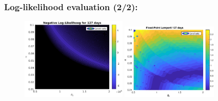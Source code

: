 \documentclass[aspectratio=169]{beamer}\usepackage[utf8]{inputenc}
\begin{document}
\begin{frame}\frametitle{Log-likelihood evaluation (2/2):}

\begin{figure}[ht!]
\centering
\includegraphics[width=0.45\textwidth]{../Results/likelihood/normal/Log-Likelihood_Zoom.eps}
\includegraphics[width=0.41\textwidth]{../Results/likelihood/lamperti/Log-Likelihood_Zoom.eps}
\end{figure}

\end{frame}
\end{document}
